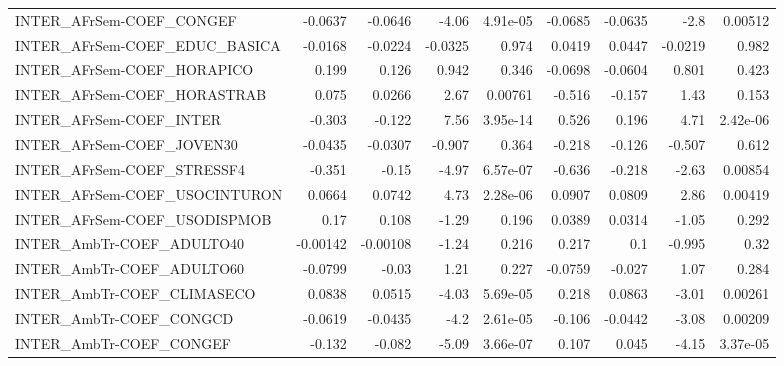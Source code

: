 \begin{tabular}{lrrrrrrrr}
INTER\_AFrSem-COEF\_CONGEF              &     -0.0637 &      -0.0646 &    -4.06 & 4.91e-05 &    -0.0685 &     -0.0635 &         -2.8 &       0.00512 \\
INTER\_AFrSem-COEF\_EDUC\_BASICA         &     -0.0168 &      -0.0224 &  -0.0325 &    0.974 &     0.0419 &      0.0447 &      -0.0219 &         0.982 \\
INTER\_AFrSem-COEF\_HORAPICO            &       0.199 &        0.126 &    0.942 &    0.346 &    -0.0698 &     -0.0604 &        0.801 &         0.423 \\
INTER\_AFrSem-COEF\_HORASTRAB           &       0.075 &       0.0266 &     2.67 &  0.00761 &     -0.516 &      -0.157 &         1.43 &         0.153 \\
INTER\_AFrSem-COEF\_INTER               &      -0.303 &       -0.122 &     7.56 & 3.95e-14 &      0.526 &       0.196 &         4.71 &      2.42e-06 \\
INTER\_AFrSem-COEF\_JOVEN30             &     -0.0435 &      -0.0307 &   -0.907 &    0.364 &     -0.218 &      -0.126 &       -0.507 &         0.612 \\
INTER\_AFrSem-COEF\_STRESSF4            &      -0.351 &        -0.15 &    -4.97 & 6.57e-07 &     -0.636 &      -0.218 &        -2.63 &       0.00854 \\
INTER\_AFrSem-COEF\_USOCINTURON         &      0.0664 &       0.0742 &     4.73 & 2.28e-06 &     0.0907 &      0.0809 &         2.86 &       0.00419 \\
INTER\_AFrSem-COEF\_USODISPMOB          &        0.17 &        0.108 &    -1.29 &    0.196 &     0.0389 &      0.0314 &        -1.05 &         0.292 \\
INTER\_AmbTr-COEF\_ADULTO40             &    -0.00142 &     -0.00108 &    -1.24 &    0.216 &      0.217 &         0.1 &       -0.995 &          0.32 \\
INTER\_AmbTr-COEF\_ADULTO60             &     -0.0799 &        -0.03 &     1.21 &    0.227 &    -0.0759 &      -0.027 &         1.07 &         0.284 \\
INTER\_AmbTr-COEF\_CLIMASECO            &      0.0838 &       0.0515 &    -4.03 & 5.69e-05 &      0.218 &      0.0863 &        -3.01 &       0.00261 \\
INTER\_AmbTr-COEF\_CONGCD               &     -0.0619 &      -0.0435 &     -4.2 & 2.61e-05 &     -0.106 &     -0.0442 &        -3.08 &       0.00209 \\
INTER\_AmbTr-COEF\_CONGEF               &      -0.132 &       -0.082 &    -5.09 & 3.66e-07 &      0.107 &       0.045 &        -4.15 &      3.37e-05 \\

\end{tabular}
